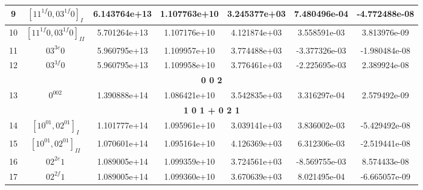 \begin{table}[h!]
\begin{tabular}{|c|c|c|c|c|c|c|}
9 & $[11^{1f}0, 03^{1f}0]_{I}$ & 6.143764e+13 & 1.107763e+10 & 3.245377e+03 & 7.480496e-04 & -4.772488e-08 \\ \hline
10 & $[11^{1f}0, 03^{1f}0]_{II}$ & 5.701264e+13 & 1.107176e+10 & 4.121874e+03 & 3.558591e-03 & 3.813976e-09 \\ \hline
11 & $03^{3e}0$ & 5.960795e+13 & 1.109957e+10 & 3.774488e+03 & -3.377326e-03 & -1.980484e-08 \\ \hline
12 & $03^{3f}0$ & 5.960795e+13 & 1.109958e+10 & 3.776461e+03 & -2.225695e-03 & 2.389924e-08 \\ \hline
\multicolumn{7}{|c|}{\textbf{0 0 2}} \\ \hline
13 & $0^002$ & 1.390888e+14 & 1.086421e+10 & 3.542835e+03 & 3.316297e-04 & 2.579492e-09 \\ \hline
\multicolumn{7}{|c|}{\textbf{1 0 1 + 0 2 1}} \\ \hline
14 & $[10^01, 02^01]_{I}$ & 1.101777e+14 & 1.095961e+10 & 3.039141e+03 & 3.836002e-03 & -5.429492e-08 \\ \hline
15 & $[10^01, 02^01]_{II}$ & 1.070601e+14 & 1.095164e+10 & 4.126369e+03 & 6.312306e-03 & -2.519441e-08 \\ \hline
16 & $02^{2e}1$ & 1.089005e+14 & 1.099359e+10 & 3.724561e+03 & -8.569755e-03 & 8.574433e-08 \\ \hline
17 & $02^{2f}1$ & 1.089005e+14 & 1.099360e+10 & 3.670639e+03 & 8.021495e-04 & -6.665057e-09 \\ \hline
\end{tabular}
\end{table}


